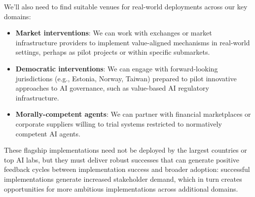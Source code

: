 We'll also need to find suitable venues for real-world deployments across our key domains:

\begin{itemize}
\item \textbf{Market interventions}: We can work with exchanges or market infrastructure providers to implement value-aligned mechanisms in real-world settings, perhaps as pilot projects or within specific submarkets.

\item \textbf{Democratic interventions}: We can engage with forward-looking jurisdictions (e.g., Estonia, Norway, Taiwan) prepared to pilot innovative approaches to AI governance, such as value-based AI regulatory infrastructure.

\item \textbf{Morally-competent agents}: We can partner with financial marketplaces or corporate suppliers willing to trial systems restricted to normatively competent AI agents.
\end{itemize}

These flagship implementations need not be deployed by the largest countries or top AI labs, but they must deliver robust successes that can generate positive feedback cycles between implementation success and broader adoption: successful implementations generate increased stakeholder demand, which in turn creates opportunities for more ambitious implementations across additional domains.